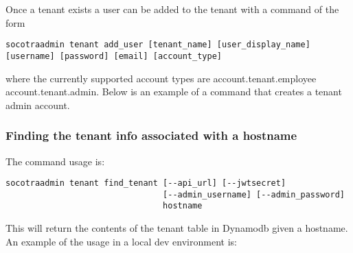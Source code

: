 Once a tenant exists a user can be added to the tenant with a command of
the form

\begin{verbatim}
socotraadmin tenant add_user [tenant_name] [user_display_name] [username] [password] [email] [account_type]
\end{verbatim}

where the currently supported account types are account.tenant.employee
\textbar{} account.tenant.admin. Below is an example of a command that
creates a tenant admin account.

\begin{Shaded}
\begin{Highlighting}[]
 
\end{Highlighting}
\end{Shaded}

\hypertarget{finding-the-tenant-info-associated-with-a-hostname}{%
\subsubsection{Finding the tenant info associated with a
hostname}\label{finding-the-tenant-info-associated-with-a-hostname}}

The command usage is:

\begin{verbatim}
socotraadmin tenant find_tenant [--api_url] [--jwtsecret]
                                [--admin_username] [--admin_password]
                                hostname
\end{verbatim}

This will return the contents of the tenant table in Dynamodb given a
hostname. An example of the usage in a local dev environment is:

\begin{Shaded}
\begin{Highlighting}[]
 
\end{Highlighting}
\end{Shaded}

